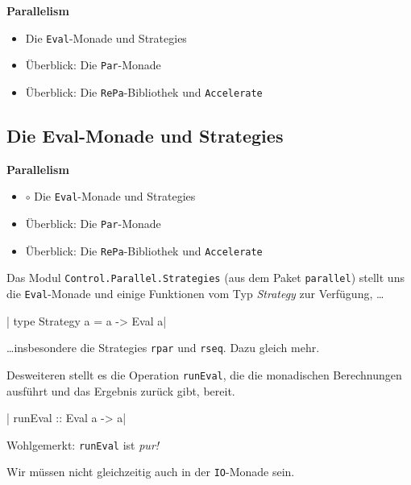 \documentclass{beamer}
\begin{document}
\begin{frame}

\begin{center}
\Large
\textbf{Parallelism}\normalsize\bigskip

\begin{itemize}
\item Die \texttt{Eval}-Monade und Strategies
\item Überblick: Die \texttt{Par}-Monade
\item Überblick: Die \texttt{RePa}-Bibliothek und \texttt{Accelerate}
\end{itemize}
\end{center}

\end{frame}


\subsection{Die Eval-Monade und Strategies}

\begin{frame}[fragile]

\begin{center}
\Large
\textbf{Parallelism}\normalsize\bigskip
\begin{itemize}
\item $\circ$ Die \texttt{Eval}-Monade und Strategies
\item Überblick: Die \texttt{Par}-Monade
\item Überblick: Die \texttt{RePa}-Bibliothek und \texttt{Accelerate}
\end{itemize}
\end{center}

\end{frame}


\begin{frame}[fragile]

Das Modul \texttt{Control.Parallel.Strategies} (aus dem Paket \texttt{parallel}) stellt uns
die \texttt{Eval}-Monade und einige Funktionen vom Typ \emph{Strategy} zur Verfügung, \dots\pause

|    type Strategy a = a -> Eval a|
\pause

\dots insbesondere die Strategies \texttt{rpar} und \texttt{rseq}. Dazu gleich mehr.\pause\bigskip

Desweiteren stellt es die Operation \texttt{runEval}, die die monadischen 
Berechnungen ausführt und das Ergebnis zurück gibt, bereit.

|    runEval :: Eval a -> a|
\pause
\bigskip

Wohlgemerkt: \texttt{runEval} ist \emph{pur!}

Wir müssen nicht gleichzeitig auch in der \texttt{IO}-Monade sein.

\end{frame}
\end{document}
